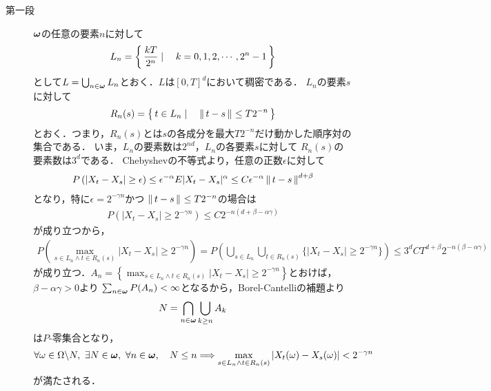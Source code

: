 	\begin{prf}\mbox{}
		\begin{description}
			\item[第一段]
				${\boldsymbol \omega}$の任意の要素$n$に対して
				\begin{align}
					L_n = \left\{\, \frac{kT}{2^n} \mid \quad k=0,1,2,\cdots,2^n-1\, \right\}
				\end{align}
				として$L = \bigcup_{n \in {\boldsymbol \omega}} L_n$とおく．$L$は$[0,T]^d$において稠密である．
				$L_n$の要素$s$に対して
				\begin{align}
					R_n(s) = \left\{\, t \in L_n \mid \quad \left\|\, t-s\, \right\|_{} \leq T2^{-n}\, \right\}
				\end{align}
				とおく．つまり，$R_n(s)$とは$s$の各成分を最大$T2^{-n}$だけ動かした順序対の集合である．
				いま，$L_n$の要素数は$2^{nd}$，$L_n$の各要素$s$に対して
				$R_n(s)$の要素数は$3^d$である．
				Chebyshevの不等式より，任意の正数$\epsilon$に対して
				\begin{align}
					P\left(|X_t-X_s|\geq\epsilon\right)
					\leq \epsilon^{-\alpha}E|X_t-X_s|^\alpha
					\leq C\epsilon^{-\alpha}\left\|\, t-s\, \right\|_{}^{d+\beta}
				\end{align}
				となり，特に$\epsilon = 2^{-\gamma n}$かつ
				$\left\|\, t-s\, \right\|_{} \leq T2^{-n}$の場合は
				\begin{align}
					P\left(|X_t-X_s|\geq2^{-\gamma n}\right)
					\leq C 2^{-n(d+\beta - \alpha \gamma)}
				\end{align}
				が成り立つから，
				\begin{align}
					P\left(\operatorname*{max}_{s \in L_n \wedge t \in R_n(s)}
					|X_t-X_s|\geq2^{-\gamma n}\right)
					= P\left(\bigcup_{s \in L_n} \bigcup_{t \in R_n(s)}
					\{|X_t-X_s|\geq2^{-\gamma n}\}\right)
					\leq 3^d C T^{d+\beta} 2^{-n(\beta - \alpha \gamma)}
				\end{align}
				が成り立つ．$A_n = \left\{\operatorname*{max}_{s \in L_n \wedge t \in R_n(s)}|X_t-X_s|\geq2^{-\gamma n}\right\}$とおけば，$\beta - \alpha \gamma > 0$より
				$\sum_{n \in {\boldsymbol \omega}}P(A_n) < \infty$となるから，Borel-Cantelliの補題より
				\begin{align}
					N = \bigcap_{n \in {\boldsymbol \omega}} \bigcup_{k \geq n} A_k
				\end{align}
				は$P$-零集合となり，
				\begin{align}
					\forall \omega \in \Omega \backslash N,\
					\exists N \in {\boldsymbol \omega},\
					\forall n \in {\boldsymbol \omega},\quad
					N \leq n \Longrightarrow \operatorname*{max}_{s \in L_n \wedge t \in R_n(s)}
					|X_t(\omega) - X_s(\omega)| < 2^{-\gamma n}
					\label{eq:chapter_2_theorem_2_8_1}
				\end{align}
				が満たされる．
				

\end{description}
\end{prf}
